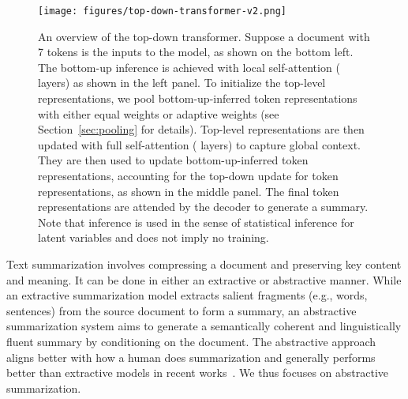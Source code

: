 \documentclass{article} \usepackage{iclr2022_conference,times}
\begin{document}
\begin{figure}
    \centering
    \texttt{[image: figures/top-down-transformer-v2.png]}
    \caption{\footnotesize An overview of the top-down transformer. Suppose a document with 7 tokens is the inputs to the model, as shown on the bottom left. The bottom-up inference is achieved with local self-attention ( layers) as shown in the left panel. To initialize the top-level representations, we pool bottom-up-inferred token representations with either equal weights or adaptive weights (see Section~\ref{sec:pooling} for details). Top-level representations are then updated with full self-attention ( layers) to capture global context. They are then used to update bottom-up-inferred token representations, accounting for the top-down update for token representations, as shown in the middle panel. The final token representations are attended by the decoder to generate a summary. Note that inference is used in the sense of statistical inference for latent variables and does not imply no training. }
    \label{fig:top-down-transformer}
\end{figure}


Text summarization involves compressing a document and preserving key content and meaning. It can be done in either an extractive or abstractive manner. While an extractive summarization model extracts salient fragments (e.g., words, sentences) from the source document to form a summary, an abstractive summarization system aims to generate a semantically coherent and linguistically fluent summary by conditioning on the document. The abstractive approach aligns better with how a human does summarization and generally performs better than extractive models in recent works~\citep{pilault-etal-2020-extractive, zhang2020pegasus}. We thus focuses on abstractive summarization.
\end{document}
